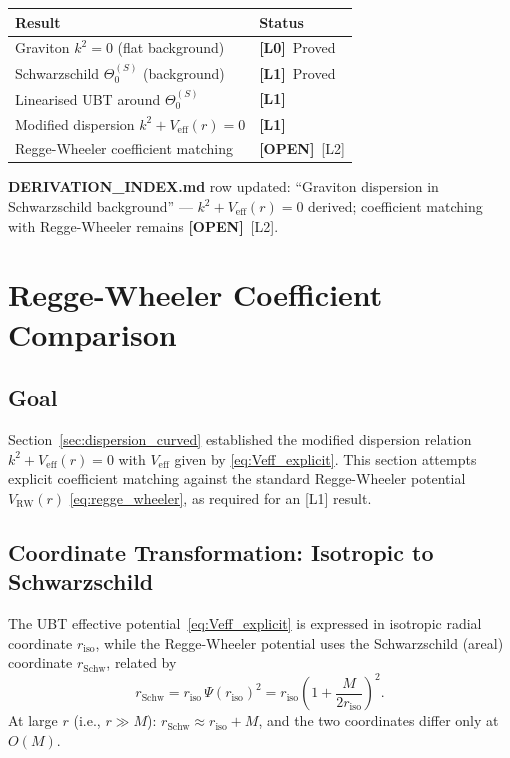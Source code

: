 \documentclass[12pt]{article}
\theoremstyle{definition}
\theoremstyle{remark}
\newcommand{\Lzero}{\textbf{[L0]}}
\newcommand{\Lone}{\textbf{[L1]}}
\newcommand{\OPEN}{\textbf{[OPEN]}}
\begin{document}
\begin{center}
\begin{tabular}{|l|l|}
\hline
\textbf{Result} & \textbf{Status} \\
\hline
Graviton $k^2=0$ (flat background) & \Lzero\ Proved \\
Schwarzschild $\Theta_0^{(S)}$ (background) & \Lone\ Proved \\
Linearised UBT around $\Theta_0^{(S)}$ & \Lone \\
Modified dispersion $k^2+V_{\text{eff}}(r)=0$ & \Lone \\
Regge-Wheeler coefficient matching & \OPEN\ [L2] \\
\hline
\end{tabular}
\end{center}

\textbf{DERIVATION\_INDEX.md} row updated:
``Graviton dispersion in Schwarzschild background'' —
$k^2 + V_{\text{eff}}(r) = 0$ derived; coefficient matching with
Regge-Wheeler remains \OPEN\ [L2].

\section{Regge-Wheeler Coefficient Comparison}
\label{sec:regge_wheeler_comparison}

\subsection{Goal}

Section~\ref{sec:dispersion_curved} established the modified dispersion
relation $k^2 + V_{\text{eff}}(r) = 0$ with $V_{\text{eff}}$ given by
\eqref{eq:Veff_explicit}.  This section attempts explicit coefficient
matching against the standard Regge-Wheeler potential $V_{\text{RW}}(r)$
\eqref{eq:regge_wheeler}, as required for an [L1] result.

\subsection{Coordinate Transformation: Isotropic to Schwarzschild}

The UBT effective potential~\eqref{eq:Veff_explicit} is expressed in
isotropic radial coordinate $r_{\text{iso}}$, while the Regge-Wheeler
potential uses the Schwarzschild (areal) coordinate $r_{\text{Schw}}$,
related by
\begin{equation}
  r_{\text{Schw}} = r_{\text{iso}}\,\Psi(r_{\text{iso}})^2
  = r_{\text{iso}}\!\left(1 + \frac{M}{2r_{\text{iso}}}\right)^{\!2}.
  \label{eq:coord_transform}
\end{equation}
At large $r$ (i.e., $r \gg M$): $r_{\text{Schw}} \approx r_{\text{iso}} + M$,
and the two coordinates differ only at $O(M)$.
\end{document}
